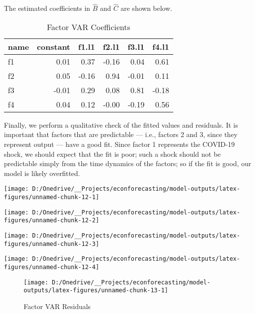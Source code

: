\documentclass[11pt, letterpaper]{article}\usepackage[]{graphicx}\usepackage[]{color}
\begin{document}
The estimated coefficients in $\widehat{B}$ and $\widehat{C}$ are shown below.
\begin{table}[H]
\centering
\begingroup\footnotesize
\begin{tabular}{lrrrrr}
  \hline
name & constant & f1.l1 & f2.l1 & f3.l1 & f4.l1 \\ 
  \hline
f1 & 0.01 & 0.37 & -0.16 & 0.04 & 0.61 \\ 
  f2 & 0.05 & -0.16 & 0.94 & -0.01 & 0.11 \\ 
  f3 & -0.01 & 0.29 & 0.08 & 0.81 & -0.18 \\ 
  f4 & 0.04 & 0.12 & -0.00 & -0.19 & 0.56 \\ 
   \hline
\end{tabular}
\endgroup
\caption{Factor VAR Coefficients} 
\end{table}



Finally, we perform a qualitative check of the fitted values and residuals. It is important that factors that are predictable --- i.e., factors 2 and 3, since they represent output --- have a good fit. Since factor 1 represents the COVID-19 shock, we should expect that the fit is poor; such a shock should not be predictable simply from the time dynamics of the factors; so if the fit is good, our model is likely overfitted.


{\centering \texttt{[image: D:/Onedrive/\_\_Projects/econforecasting/model-outputs/latex-figures/unnamed-chunk-12-1]} 

}




{\centering \texttt{[image: D:/Onedrive/\_\_Projects/econforecasting/model-outputs/latex-figures/unnamed-chunk-12-2]} 

}




{\centering \texttt{[image: D:/Onedrive/\_\_Projects/econforecasting/model-outputs/latex-figures/unnamed-chunk-12-3]} 

}




{\centering \texttt{[image: D:/Onedrive/\_\_Projects/econforecasting/model-outputs/latex-figures/unnamed-chunk-12-4]} 

}





\begin{figure}[H]

{\centering \texttt{[image: D:/Onedrive/\_\_Projects/econforecasting/model-outputs/latex-figures/unnamed-chunk-13-1]} 

}

\caption[Factor VAR Residuals]{Factor VAR Residuals}\label{fig:unnamed-chunk-13}
\end{figure}
\end{document}
